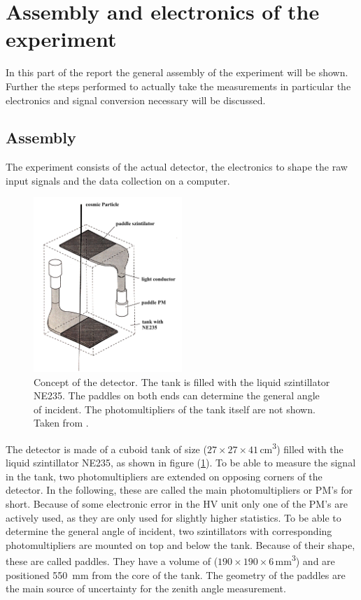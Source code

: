 \section{Assembly and electronics of the experiment} \label{sec:aufbau}

In this part of the report the general assembly of the experiment will be shown.
Further the steps performed to actually take the measurements in particular the electronics and signal conversion necessary will be discussed.

\subsection{Assembly}

	The experiment consists of the actual detector, the electronics to shape the raw input signals and the data collection on a computer.

	\begin{figure}[ht]
		\centering
		\includegraphics[width=0.5\textwidth]{img/aufbau.jpg}
		\caption{Concept of the detector. 
			The tank is filled with the liquid szintillator NE235.
			The paddles on both ends can determine the general angle of incident.
			The photomultipliers of the tank itself are not shown.
			Taken from \cite{wwu}.}
		\label{fig:detector}
	\end{figure}
	
	The detector is made of a cuboid tank of size ($27 \times 27 \times 41$\,\si{\centi\meter\cubed}) filled with the liquid szintillator NE235, as shown in figure (\ref{fig:detector}).
	To be able to measure the signal in the tank, two photomultipliers are extended on opposing corners of the detector.
	In the following, these are called the main photomultipliers or PM's for short.
	Because of some electronic error in the HV unit only one of the PM's are actively used, as they are only used for slightly higher statistics.
	To be able to determine the general angle of incident, two szintillators with corresponding photomultipliers are mounted on top and below the tank.
	Because of their shape, these are called paddles.
	They have a volume of ($190 \times 190 \times 6$\,\si{\milli\meter\cubed}) and are positioned \SI{550}{\milli\meter} from the core of the tank.
	The geometry of the paddles are the main source of uncertainty for the zenith angle measurement.
	
